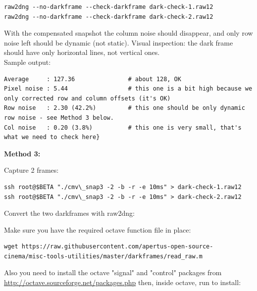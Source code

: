 \begin{lstlisting}[breaklines=true, breakatwhitespace=true]
raw2dng --no-darkframe --check-darkframe dark-check-1.raw12
raw2dng --no-darkframe --check-darkframe dark-check-2.raw12
\end{lstlisting} 

With the compensated snapshot the column noise should disappear, and only row noise left should be dynamic (not static). Visual inspection: the dark frame should have only horizontal lines, not vertical ones.\\

Sample output: 

\begin{lstlisting}[breaklines=true, breakatwhitespace=true]
Average     : 127.36               # about 128, OK
Pixel noise : 5.44                 # this one is a bit high because we only corrected row and column offsets (it's OK)
Row noise   : 2.30 (42.2%)         # this one should be only dynamic row noise - see Method 3 below.
Col noise   : 0.20 (3.8%)          # this one is very small, that's what we need to check here}
\end{lstlisting} 


\textbf{Method 3:}

Capture 2 frames: 

\begin{lstlisting}[breaklines=true, breakatwhitespace=true]
ssh root@$BETA "./cmv\_snap3 -2 -b -r -e 10ms" > dark-check-1.raw12 
ssh root@$BETA "./cmv\_snap3 -2 -b -r -e 10ms" > dark-check-2.raw12 
\end{lstlisting} 

Convert the two darkframes with raw2dng: 


Make sure you have the required octave function file in place: 

\begin{lstlisting}[breaklines=true, breakatwhitespace=true]
wget https://raw.githubusercontent.com/apertus-open-source-cinema/misc-tools-utilities/master/darkframes/read_raw.m
\end{lstlisting} 

Also you need to install the octave "signal" and "control" packages from \href{http://octave.sourceforge.net/packages.php}{http://octave.sourceforge.net/packages.php} then, inside octave, run to install:



